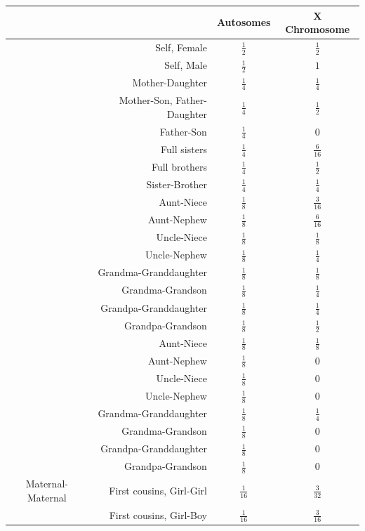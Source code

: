 \documentclass[11pt]{article} %
\begin{document}
\bgroup
\def\arraystretch{1.5}
\begin{table}[ht]
\small
\centering
\begin{tabular}{crcc}
  \hline
&& Autosomes & X Chromosome\\
  \hline
& Self, Female & $\frac{1}{2}$ & $\frac{1}{2}$ \\
& Self, Male & $\frac{1}{2}$ & $1$ \\ \hline
&Mother-Daughter &$\frac{1}{4}$ & $\frac{1}{4}$\\
&Mother-Son, Father-Daughter &$\frac{1}{4}$& $\frac{1}{2}$\\
&Father-Son &$\frac{1}{4}$&0\\
&Full sisters & $\frac{1}{4}$ & $\frac{6}{16}$\\
&Full brothers &$\frac{1}{4}$&$\frac{1}{2}$\\
&Sister-Brother &$\frac{1}{4}$&$\frac{1}{4}$\\
\hline
\parbox[t]{2mm}{} & Aunt-Niece &$\frac{1}{8}$&$\frac{3}{16}$\\
&Aunt-Nephew&$\frac{1}{8}$&$\frac{6}{16}$\\
&Uncle-Niece &$\frac{1}{8}$&$\frac{1}{8}$\\
&Uncle-Nephew &$\frac{1}{8}$&$\frac{1}{4}$\\
&Grandma-Granddaughter &$\frac{1}{8}$&$\frac{1}{8}$\\
&Grandma-Grandson &$\frac{1}{8}$&$\frac{1}{4}$\\
&Grandpa-Granddaughter&$\frac{1}{8}$&$\frac{1}{4}$\\
&Grandpa-Grandson &$\frac{1}{8}$&$\frac{1}{2}$\\
\hline
\parbox[t]{2mm}{} &Aunt-Niece &$\frac{1}{8}$&$\frac{1}{8}$\\
&Aunt-Nephew&$\frac{1}{8}$&0\\
&Uncle-Niece &$\frac{1}{8}$&0\\
&Uncle-Nephew &$\frac{1}{8}$&0\\
&Grandma-Granddaughter &$\frac{1}{8}$&$\frac{1}{4}$\\
&Grandma-Grandson &$\frac{1}{8}$&0\\
&Grandpa-Granddaughter&$\frac{1}{8}$&0\\
&Grandpa-Grandson &$\frac{1}{8}$&0\\
   \hline \hline
Maternal-Maternal & First cousins, Girl-Girl & $\frac{1}{16}$ & $\frac{3}{32}$\\
& First cousins, Girl-Boy & $\frac{1}{16}$ & $\frac{3}{16}$\\

\end{tabular}
\end{table}
\end{document}
